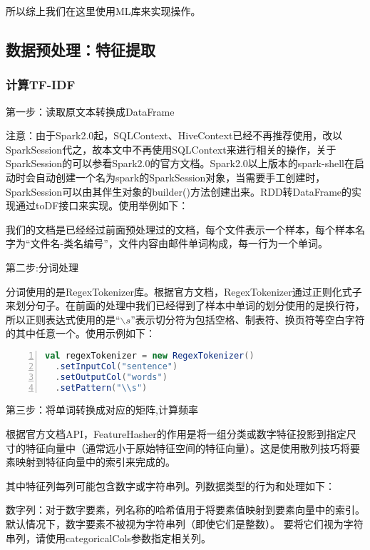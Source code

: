 \documentclass[lang=cn,11pt]{elegantpaper}
\begin{document}
所以综上我们在这里使用ML库来实现操作。
\subsection{数据预处理：特征提取}
\subsubsection{计算TF-IDF}
第一步：读取原文本转换成DataFrame

注意：由于Spark2.0起，SQLContext、HiveContext已经不再推荐使用，改以SparkSession代之，故本文中不再使用SQLContext来进行相关的操作，关于SparkSession的可以参看Spark2.0的官方文档。Spark2.0以上版本的spark-shell在启动时会自动创建一个名为spark的SparkSession对象，当需要手工创建时，SparkSession可以由其伴生对象的builder()方法创建出来。RDD转DataFrame的实现通过toDF接口来实现。使用举例如下：


我们的文档是已经经过前面预处理过的文档，每个文件表示一个样本，每个样本名字为“文件名-类名编号”，文件内容由邮件单词构成，每一行为一个单词。

第二步:分词处理

分词使用的是RegexTokenizer库。根据官方文档，RegexTokenizer通过正则化式子来划分句子。在前面的处理中我们已经得到了样本中单词的划分使用的是换行符，所以正则表达式使用的是“$\backslash s$”表示切分符为包括空格、制表符、换页符等空白字符的其中任意一个。使用示例如下：
\begin{lstlisting}[language={Scala},numbers=left,numberstyle=\tiny,%frame=shadowbox,  
  rulesepcolor=\color{red!20!green!20!blue!20},  
  keywordstyle=\color{blue!70!black},  
  commentstyle=\color{blue!90!},  
  basicstyle=\ttfamily]  
val regexTokenizer = new RegexTokenizer()
  .setInputCol("sentence")
  .setOutputCol("words")
  .setPattern("\\s")
\end{lstlisting}\par

第三步：将单词转换成对应的矩阵,计算频率

根据官方文档API，FeatureHasher的作用是将一组分类或数字特征投影到指定尺寸的特征向量中（通常远小于原始特征空间的特征向量）。这是使用散列技巧将要素映射到特征向量中的索引来完成的。

其中特征列每列可能包含数字或字符串列。列数据类型的行为和处理如下：

数字列：对于数字要素，列名称的哈希值用于将要素值映射到要素向量中的索引。
默认情况下，数字要素不被视为字符串列（即使它们是整数）。
要将它们视为字符串列，请使用categoricalCols参数指定相关列。
\end{document}
